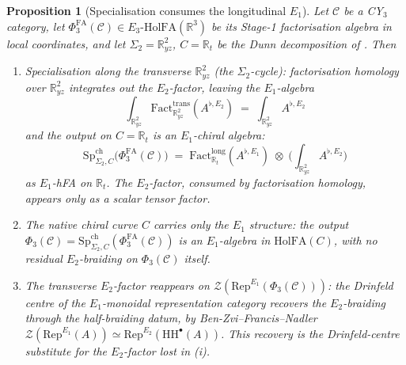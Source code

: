 \documentclass[11pt]{article}
\newtheorem{proposition}[theorem]{Proposition}
\newcommand{\Eone}{E_{1}}
\newcommand{\Etwo}{E_{2}}
\newcommand{\R}{\mathbb{R}}
\newcommand{\HH}{\mathrm{HH}}
\newcommand{\PhiFA}{\Phi^{\mathrm{FA}}}
\newcommand{\SpCh}{\mathrm{Sp}^{\mathrm{ch}}}
\newcommand{\HolFA}{\mathrm{HolFA}}
\newcommand{\cC}{\mathcal{C}}
\newcommand{\cZ}{\mathcal{Z}}
\newcommand{\Rep}{\mathrm{Rep}}
\begin{document}
\begin{proposition}[Specialisation consumes the longitudinal $\Eone$]
\label{prop:specialisation-consumption}
Let $\cC$ be a CY$_{3}$ category, let
$\PhiFA_{3}(\cC) \in E_{3}\text{-}\HolFA(\R^{3})$ be its Stage-1
factorisation algebra in local coordinates, and let
$\Sigma_{2} = \R^{2}_{yz}$, $C = \R_{t}$ be the Dunn decomposition of
. Then
\begin{enumerate}[label=(\roman*), leftmargin=*]
  \item \emph{Specialisation along the transverse $\R^{2}_{yz}$}
    (the $\Sigma_{2}$-cycle):
    factorisation homology over $\R^{2}_{yz}$ integrates out the
    $\Etwo$-factor, leaving the $\Eone$-algebra
    \[
      \int_{\R^{2}_{yz}} \mathrm{Fact}^{\mathrm{trans}}_{\R^{2}_{yz}}
      (A^{\flat, \Etwo}) \;=\;
      \int_{\R^{2}_{yz}} A^{\flat, \Etwo}
    \]
    and the output on $C = \R_{t}$ is an $\Eone$-chiral algebra:
    \[
      \SpCh_{\Sigma_{2}, C}\bigl(\PhiFA_{3}(\cC)\bigr)
      \;=\;
      \mathrm{Fact}^{\mathrm{long}}_{\R_{t}}(A^{\flat, \Eone})
      \;\otimes\;
      \bigl({\textstyle\int_{\R^{2}_{yz}}} A^{\flat, \Etwo}\bigr)
    \]
    as $\Eone$-hFA on $\R_{t}$. The $\Etwo$-factor, consumed by
    factorisation homology, appears only as a scalar tensor factor.
  \item \emph{The native chiral curve $C$ carries only the $\Eone$
    structure}: the output $\Phi_{3}(\cC) = \SpCh_{\Sigma_{2}, C}
    (\PhiFA_{3}(\cC))$ is an $\Eone$-algebra in $\HolFA(C)$, with no
    residual $\Etwo$-braiding on $\Phi_{3}(\cC)$ itself.
  \item \emph{The transverse $\Etwo$-factor reappears on
    $\cZ(\Rep^{\Eone}(\Phi_{3}(\cC)))$}: the Drinfeld centre of the
    $\Eone$-monoidal representation category recovers the
    $\Etwo$-braiding through the half-braiding datum, by
    Ben-Zvi--Francis--Nadler
    $\cZ(\Rep^{\Eone}(A)) \simeq \Rep^{\Etwo}(\HH^{\bullet}(A))$.
    This recovery is the Drinfeld-centre substitute for the
    $\Etwo$-factor lost in (i).
\end{enumerate}
\end{proposition}
\end{document}
